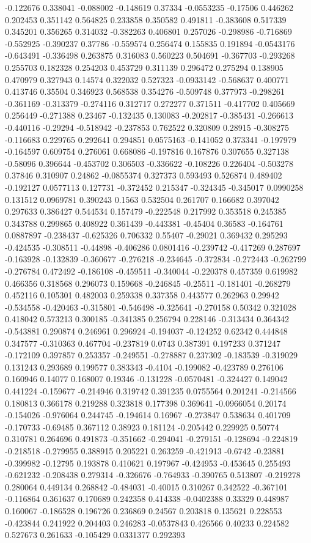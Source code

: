 -0.122676 0.338041 -0.088002 -0.148619 0.37334 -0.0553235 -0.17506 0.446262 0.202453 0.351142 0.564825 0.233858 0.350582 0.491811 -0.383608 0.517339 0.345201 0.356265 0.314032 -0.382263 0.406801 0.257026 -0.298986 -0.716869 -0.552925 -0.390237 0.37786 -0.559574 0.256474 0.155835 0.191894 -0.0543176 -0.643491 -0.336498 0.263875 0.316083 0.560223 0.504691 -0.367703 -0.293268 0.255703 0.182328 0.254203 0.453729 0.311139 0.296472 0.275294 0.138905 0.470979 0.327943 0.14574 0.322032 0.527323 -0.0933142 -0.568637 0.400771 0.413746 0.35504 0.346923 0.568538 0.354276 -0.509748 0.377973 -0.298261 -0.361169 -0.313379 -0.274116 0.312717 0.272277 0.371511 -0.417702 0.405669 0.256449 -0.271388 0.23467 -0.132435 0.130083 -0.202817 -0.385431 -0.266613 -0.440116 -0.29294 -0.518942 -0.237853 0.762522 0.320809 0.28915 -0.308275 -0.116683 0.229765 0.292641 0.294851 0.0575163 -0.141052 0.373341 -0.197979 -0.164597 0.609754 0.276061 0.668086 -0.197816 0.167876 0.307655 0.327138 -0.58096 0.396644 -0.453702 0.306503 -0.336622 -0.108226 0.226404 -0.503278 0.37846 0.310907 0.24862 -0.0855374 0.327373 0.593493 0.526874 0.489402 -0.192127 0.0577113 0.127731 -0.372452 0.215347 -0.324345 -0.345017 0.0990258 0.131512 0.0969781 0.390243 0.1563 0.532504 0.261707 0.166682 0.397042 0.297633 0.386427 0.544534 0.157479 -0.222548 0.217992 0.353518 0.245385 0.343788 0.299865 0.408922 0.361439 -0.443381 -0.45404 0.36583 -0.164761 0.0887897 -0.238437 -0.625326 0.706332 0.55407 -0.29021 0.369432 0.295293 -0.424535 -0.308511 -0.44898 -0.406286 0.0801416 -0.239742 -0.417269 0.287697 -0.163928 -0.132839 -0.360677 -0.276218 -0.234645 -0.372834 -0.272443 -0.262799 -0.276784 0.472492 -0.186108 -0.459511 -0.340044 -0.220378 0.457359 0.619982 0.466356 0.318568 0.296073 0.159668 -0.246845 -0.25511 -0.181401 -0.268279 0.452116 0.105301 0.482003 0.259338 0.337358 0.443577 0.262963 0.29942 -0.534558 -0.420463 -0.315801 -0.546498 -0.325641 -0.270158 0.50342 0.321028 0.418042 0.573213 0.300185 -0.341385 0.256794 0.228146 -0.313434 0.364342 -0.543881 0.290874 0.246961 0.296924 -0.194037 -0.124252 0.62342 0.444848 0.347577 -0.310363 0.467704 -0.237819 0.0743 0.387391 0.197233 0.371247 -0.172109 0.397857 0.253357 -0.249551 -0.278887 0.237302 -0.183539 -0.319029 0.131243 0.293689 0.199577 0.383343 -0.4104 -0.199082 -0.423789 0.276106 0.160946 0.14077 0.168007 0.19346 -0.131228 -0.0570481 -0.324427 0.149042 0.441224 -0.159677 -0.214946 0.319742 0.391235 0.0755564 0.201241 -0.214566 0.180813 0.366178 0.219288 0.323818 0.177398 0.369641 -0.0966054 0.20174 -0.154026 -0.976064 0.244745 -0.194614 0.16967 -0.273847 0.538634 0.401709 -0.170733 -0.69485 0.367112 0.38923 0.181124 -0.205442 0.229925 0.50774 0.310781 0.264696 0.491873 -0.351662 -0.294041 -0.279151 -0.128694 -0.224819 -0.218518 -0.279955 0.388915 0.205221 0.263259 -0.421913 -0.6742 -0.23881 -0.399982 -0.12795 0.193878 0.410621 0.197967 -0.424953 -0.453645 0.255493 -0.621232 -0.208438 0.279314 -0.326676 -0.764933 -0.390765 0.513807 -0.219278 0.280064 0.449134 0.268842 -0.484031 -0.40015 0.310267 0.342522 -0.367101 -0.116864 0.361637 0.170689 0.242358 0.414338 -0.0402388 0.33329 0.448987 0.160067 -0.186528 0.196726 0.236869 0.24567 0.203818 0.135621 0.228553 -0.423844 0.241922 0.204403 0.246283 -0.0537843 0.426566 0.40233 0.224582 0.527673 0.261633 -0.105429 0.0331377 0.292393 